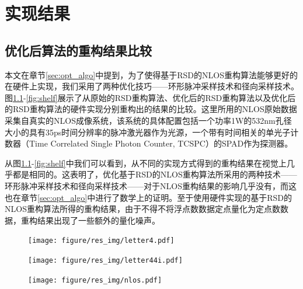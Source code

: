 \documentclass[master]{shtthesis}             %
\begin{document}
\chapter{实现结果}
\section{优化后算法的重构结果比较}

本文在章节\ref{sec:opt_algo}中提到，为了使得基于RSD的NLOS重构算法能够更好的在硬件上实现，我们采用了两种优化技巧——环形脉冲采样技术和径向采样技术。图\ref{fig:letter4}-\ref{fig:shelf}展示了从原始的RSD重构算法、优化后的RSD重构算法以及优化后的RSD重构算法的硬件实现分别重构出的结果的比较。这里所用的NLOS原始数据采集自真实的NLOS成像系统\citep{Liu}，该系统的具体配置包括一个功率1W的532nm孔径大小的具有35ps时间分辨率的脉冲激光器作为光源，一个带有时间相关的单光子计数器（Time Correlated Single Photon Counter, TCSPC）的SPAD作为探测器。

从图\ref{fig:letter4}-\ref{fig:shelf}中我们可以看到，从不同的实现方式得到的重构结果在视觉上几乎都是相同的。这表明了，优化基于RSD的NLOS重构算法所采用的两种技术——环形脉冲采样技术和径向采样技术——对于NLOS重构结果的影响几乎没有，而这也在章节\ref{sec:opt_algo}中进行了数学上的证明。至于使用硬件实现的基于RSD的NLOS重构算法所得的重构结果，由于不得不将浮点数数据定点量化为定点数数据，重构结果出现了一些额外的量化噪声。
\begin{figure}[htbp]
  \centering
  \texttt{[image: figure/res\_img/letter4.pdf]}
  \label{fig:letter4}
\end{figure}

\begin{figure}[htbp]
  \centering
  \texttt{[image: figure/res\_img/letter44i.pdf]}
  \label{fig:letter44i}
\end{figure}

\begin{figure}[htbp]
  \centering
  \texttt{[image: figure/res\_img/nlos.pdf]}
  \label{fig:nlos}
\end{figure}
\end{document}

